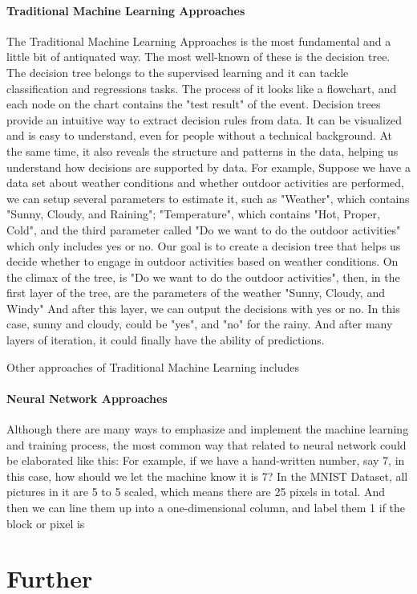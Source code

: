\documentclass[12pt]{article}
\begin{document}
\paragraph{Traditional Machine Learning Approaches}
The Traditional Machine Learning Approaches is the most fundamental and a little bit of antiquated way. The most well-known of these is the decision tree. The decision tree belongs to the supervised learning and it can tackle classification and regressions tasks. The process of it looks like a flowchart, and each node on the chart contains the "test result" of the event. Decision trees provide an intuitive way to extract decision rules from data. It can be visualized and is easy to understand, even for people without a technical background. At the same time, it also reveals the structure and patterns in the data, helping us understand how decisions are supported by data. For example, Suppose we have a data set about weather conditions and whether outdoor activities are performed, we can setup several parameters to estimate it, such as "Weather", which contains "Sunny, Cloudy, and Raining"; "Temperature", which contains "Hot, Proper, Cold", and the third parameter called "Do we want to do the outdoor activities" which only includes yes or no. Our goal is to create a decision tree that helps us decide whether to engage in outdoor activities based on weather conditions. On the climax of the tree, is "Do we want to do the outdoor activities", then, in the first layer of the tree, are the parameters of the weather "Sunny, Cloudy, and Windy" And after this layer, we can output the decisions with yes or no. In this case, sunny and cloudy, could be "yes", and "no" for the rainy. And after many layers of iteration, it could finally have the ability of predictions.

Other approaches of Traditional Machine Learning includes 

\paragraph{Neural Network Approaches}
Although there are many ways to emphasize and implement the machine learning and training process, the most common way that related to neural network could be elaborated like this: For example, if we have a hand-written number, say 7, in this case, how should we let the machine know it is 7? In the MNIST Dataset, all pictures in it are 5 to 5 scaled, which means there are 25 pixels in total. And then we can line them up into a one-dimensional column, and label them 1 if the block or pixel is 

\section{Further }


\cite{824821}
\cite{NIPS2008_66368270}
\cite{6981034}
\end{document}
